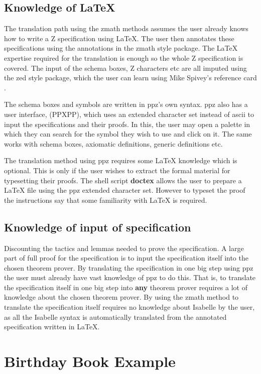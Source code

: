 \subsection{Knowledge of \LaTeX}
The translation path using the \gls{zmath} methods assumes the user already
knows how to write a Z specification using \LaTeX{}. The user then annotates
these specifications using the annotations in the \gls{zmath} style package. The
\LaTeX{} expertise required for the translation is enough so the whole Z
specification is covered. The input of the schema boxes, Z characters etc are
all imputed using the zed style package, which the user can learn using Mike
Spivey's reference card \cite{zrefcard}.

The schema boxes and symbols are written in \gls{ppz}'s own syntax. \gls{ppz}
also has a user interface, (PPXPP), which uses an extended character set
instead of ascii to input the specifications and their proofs. In this, the user
may open a palette in which they can search for the symbol they wish to use and
click on it. The same works with schema boxes, axiomatic definitions, generic
definitions etc. 

The translation method using \gls{ppz} requires some \LaTeX{} knowledge which is
optional. This is only if the user wishes to extract the formal material for
typesetting their proofs. The shell script \textbf{doctex} allows the user to
prepare a \LaTeX{} file using the \gls{ppz} extended character set. However to
typeset the proof the instructions say that some familiarity with \LaTeX{} is
required.

\subsection{Knowledge of input of specification}
Discounting the tactics and lemmas needed to prove the specification. A large
part of full proof for the specification is to input the specification itself
into the chosen theorem prover. By translating the specification in one big step
using \gls{ppz} the user must already have vast knowledge of \gls{ppz} to do
this. That is, to translate the specification itself in one big step into
\textbf{any} theorem prover requires a lot of knowledge about the chosen theorem
prover. By using the \gls{zmath} method to translate the specification itself
requires no knowledge about Isabelle by the user, as all the Isabelle syntax is
automatically translated from the annotated specification written in \LaTeX{}. 

\section{Birthday Book Example}

